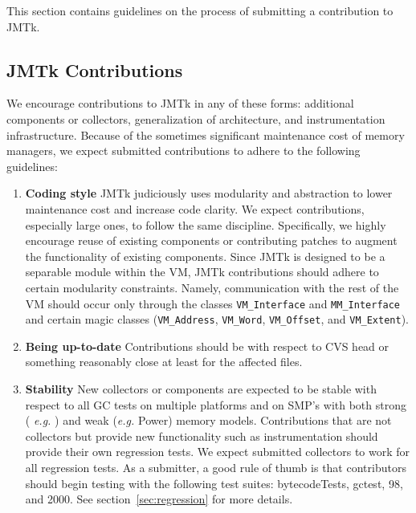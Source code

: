 This section contains guidelines on the process of
submitting a contribution to JMTk.


\subsection{JMTk Contributions}

We encourage contributions to JMTk in any of these forms: additional
components or collectors, generalization of architecture,
and instrumentation infrastructure.  Because of the sometimes significant
maintenance cost of memory managers, we expect submitted contributions
to adhere to the following guidelines:


\begin{enumerate}

\item {\bf Coding style}  
JMTk judiciously uses modularity and abstraction to lower maintenance
cost and increase code clarity.  We expect contributions, especially
large ones, to follow the same discipline.  Specifically, we highly
encourage reuse of existing components or contributing patches to
augment the functionality of existing components.  Since JMTk is
designed to be a separable module within the VM, JMTk contributions
should adhere to certain modularity constraints.  Namely,
communication with the rest of the VM should occur only through the
classes {\tt VM\_Interface} and {\tt MM\_Interface} and certain magic classes
({\tt VM\_Address}, {\tt VM\_Word}, {\tt VM\_Offset}, and {\tt VM\_Extent}).

\item {\bf Being up-to-date}  
Contributions should be with respect to CVS head or something
reasonably close at least for the affected files.

\item { \bf Stability}  
New collectors or components are expected to be stable with respect to
all GC tests on multiple platforms and on SMP's with both strong ({\it
e.g.} \IntelR{}) and weak ({\it e.g.} Power) memory models.  Contributions
that are not collectors but provide new functionality such as
instrumentation should provide their own regression tests.
We expect submitted collectors to work for all regression tests.
As a submitter, a good rule of thumb is that contributors should begin
testing with the following test suites: bytecodeTests, gctest, 
\SPECjvmR{}98, and \SPECjbbR{}2000.  See section~\ref{sec:regression}
for more details.


\end{enumerate}
